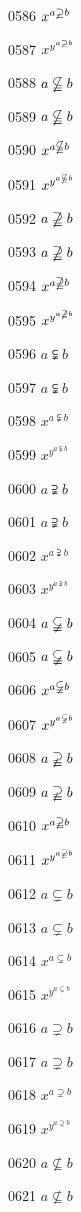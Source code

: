 \documentclass{article}
\begin{document}
0586 $x^{a\varsupsetneq b}$\par
0587 $x^{y^{a\varsupsetneq b}}$\par
0588 $a\nsubseteqq b$\par
0589 $\displaystyle a\nsubseteqq b$\par
0590 $x^{a\nsubseteqq b}$\par
0591 $x^{y^{a\nsubseteqq b}}$\par
0592 $a\nsupseteqq b$\par
0593 $\displaystyle a\nsupseteqq b$\par
0594 $x^{a\nsupseteqq b}$\par
0595 $x^{y^{a\nsupseteqq b}}$\par
0596 $a\subsetneqq b$\par
0597 $\displaystyle a\subsetneqq b$\par
0598 $x^{a\subsetneqq b}$\par
0599 $x^{y^{a\subsetneqq b}}$\par
0600 $a\supsetneqq b$\par
0601 $\displaystyle a\supsetneqq b$\par
0602 $x^{a\supsetneqq b}$\par
0603 $x^{y^{a\supsetneqq b}}$\par
0604 $a\varsubsetneqq b$\par
0605 $\displaystyle a\varsubsetneqq b$\par
0606 $x^{a\varsubsetneqq b}$\par
0607 $x^{y^{a\varsubsetneqq b}}$\par
0608 $a\varsupsetneqq b$\par
0609 $\displaystyle a\varsupsetneqq b$\par
0610 $x^{a\varsupsetneqq b}$\par
0611 $x^{y^{a\varsupsetneqq b}}$\par
0612 $a\subsetneq b$\par
0613 $\displaystyle a\subsetneq b$\par
0614 $x^{a\subsetneq b}$\par
0615 $x^{y^{a\subsetneq b}}$\par
0616 $a\supsetneq b$\par
0617 $\displaystyle a\supsetneq b$\par
0618 $x^{a\supsetneq b}$\par
0619 $x^{y^{a\supsetneq b}}$\par
0620 $a\nsubseteq b$\par
0621 $\displaystyle a\nsubseteq b$\par
\end{document}
